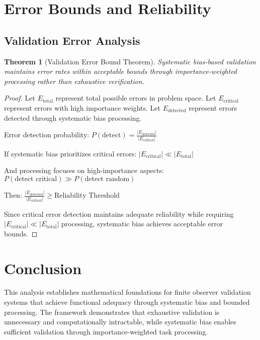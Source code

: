 \documentclass[12pt,a4paper]{article}
\newtheorem{theorem}{Theorem}
\begin{document}
\section{Error Bounds and Reliability}

\subsection{Validation Error Analysis}

\begin{theorem}[Validation Error Bound Theorem]
Systematic bias-based validation maintains error rates within acceptable bounds through importance-weighted processing rather than exhaustive verification.
\end{theorem}

\begin{proof}
Let $E_{\text{total}}$ represent total possible errors in problem space.
Let $E_{\text{critical}}$ represent errors with high importance weights.
Let $E_{\text{detected}}$ represent errors detected through systematic bias processing.

Error detection probability: $P(\text{detect}) = \frac{|E_{\text{detected}}|}{|E_{\text{critical}}|}$

If systematic bias prioritizes critical errors: $|E_{\text{critical}}| \ll |E_{\text{total}}|$

And processing focuses on high-importance aspects: $P(\text{detect critical}) \gg P(\text{detect random})$

Then: $\frac{|E_{\text{detected}}|}{|E_{\text{critical}}|} \geq \text{Reliability Threshold}$

Since critical error detection maintains adequate reliability while requiring $|E_{\text{critical}}| \ll |E_{\text{total}}|$ processing, systematic bias achieves acceptable error bounds.
\end{proof}

\section{Conclusion}

This analysis establishes mathematical foundations for finite observer validation systems that achieve functional adequacy through systematic bias and bounded processing. The framework demonstrates that exhaustive validation is unnecessary and computationally intractable, while systematic bias enables sufficient validation through importance-weighted task processing.
\end{document}
